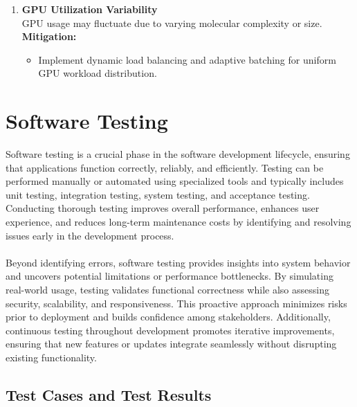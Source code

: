 \documentclass[12pt,a4]{report}
\begin{document}
\begin{enumerate}[label=\textbf{\Alph*.}, leftmargin=1.2cm]
    \vspace{0.4cm}
    \item \textbf{GPU Utilization Variability} \\
    \hspace{0.3in}
    GPU usage may fluctuate due to varying molecular complexity or size. \\
    \hspace{0.3in}
    \textbf{Mitigation:}
    \begin{itemize}
        \item Implement dynamic load balancing and adaptive batching for uniform GPU workload distribution.\\
    \end{itemize}
\end{enumerate}

\section{Software Testing}
\hspace{1cm}Software testing is a crucial phase in the software development lifecycle, ensuring that applications function correctly, reliably, and efficiently. Testing can be performed manually or automated using specialized tools and typically includes unit testing, integration testing, system testing, and acceptance testing. Conducting thorough testing improves overall performance, enhances user experience, and reduces long-term maintenance costs by identifying and resolving issues early in the development process. \\\\
\hspace*{1cm}Beyond identifying errors, software testing provides insights into system behavior and uncovers potential limitations or performance bottlenecks. By simulating real-world usage, testing validates functional correctness while also assessing security, scalability, and responsiveness. This proactive approach minimizes risks prior to deployment and builds confidence among stakeholders. Additionally, continuous testing throughout development promotes iterative improvements, ensuring that new features or updates integrate seamlessly without disrupting existing functionality.\\

\vspace{0.8cm}
\subsection{Test Cases and Test Results}
\end{document}
